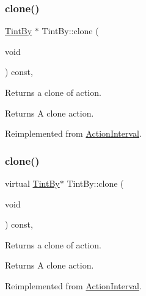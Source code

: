 \subsubsection{\texorpdfstring{clone()}{clone()}\hspace{0.1cm}{\footnotesize\ttfamily [1/2]}}
{\footnotesize\ttfamily \hyperlink{classTintBy}{Tint\+By} $\ast$ Tint\+By\+::clone (\begin{DoxyParamCaption}\item[{void}]{ }\end{DoxyParamCaption}) const\hspace{0.3cm}{\ttfamily [override]}, {\ttfamily [virtual]}}

Returns a clone of action.

\begin{DoxyReturn}{Returns}
A clone action. 
\end{DoxyReturn}


Reimplemented from \hyperlink{classActionInterval_abc93ce0c2f54a90eb216a7803f25f44a}{Action\+Interval}.

\mbox{\label{classTintBy_ad0e16ede575fa7496de3191baeba9d95}} 
\subsubsection{\texorpdfstring{clone()}{clone()}\hspace{0.1cm}{\footnotesize\ttfamily [2/2]}}
{\footnotesize\ttfamily virtual \hyperlink{classTintBy}{Tint\+By}$\ast$ Tint\+By\+::clone (\begin{DoxyParamCaption}\item[{void}]{ }\end{DoxyParamCaption}) const\hspace{0.3cm}{\ttfamily [override]}, {\ttfamily [virtual]}}

Returns a clone of action.

\begin{DoxyReturn}{Returns}
A clone action. 
\end{DoxyReturn}


Reimplemented from \hyperlink{classActionInterval_abc93ce0c2f54a90eb216a7803f25f44a}{Action\+Interval}.

\mbox{\label{classTintBy_a48ae19b213fee7b49b2c89418114d9da}} 
